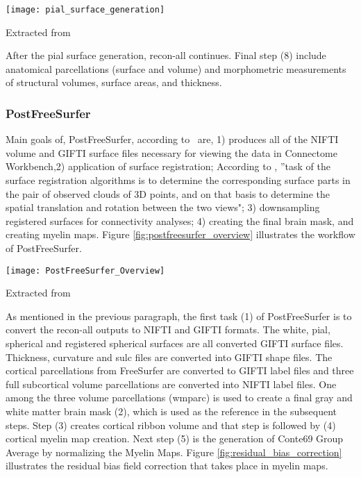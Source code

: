 \begin{center}
  \texttt{[image: pial\_surface\_generation]}
  \label{fig:pial_surface_generation}
  \caption*{Extracted from \cite{Gla13}}
\end{center}

After the pial surface generation, recon-all continues. Final step (8) include anatomical parcellations (surface and volume) and morphometric measurements of structural volumes, surface areas, and thickness.

\subsubsection{PostFreeSurfer}
Main goals of, PostFreeSurfer, according to~\cite{Gla13} are, 1) produces all of the NIFTI volume and GIFTI surface files necessary for viewing the data in Connectome Workbench,2) application of surface registration; According to \cite{DBLP:journals/corr/HrgeticP13}, ''task of the surface registration algorithms is to determine the corresponding surface parts in the pair of observed clouds of 3D points, and on that basis to determine the spatial translation and rotation between the two views"; 3) downsampling registered surfaces for connectivity analyses; 4) creating the final brain mask, and creating myelin maps. Figure \ref{fig:postfreesurfer_overview} illustrates the workflow of PostFreeSurfer.\\

\begin{center}
  \texttt{[image: PostFreeSurfer\_Overview]}
  \label{fig:postfreesurfer_overview}
  \caption*{Extracted from \cite{Gla13}}
\end{center}

As mentioned in the previous paragraph, the first task (1) of PostFreeSurfer is to convert the recon-all outputs to NIFTI and GIFTI formats. The white, pial, spherical and registered spherical surfaces are all converted GIFTI surface files. Thickness, curvature and sulc files are converted into GIFTI shape files. The cortical parcellations from FreeSurfer are converted to GIFTI label files and three full subcortical volume parcellations are converted into NIFTI label files. One among the three volume parcellations (wmparc) is used to create a final gray and white matter brain mask (2), which is used as the reference in the subsequent steps. Step (3) creates cortical ribbon volume and that step is followed by (4) cortical myelin map creation. Next step (5) is the generation of Conte69 Group Average by normalizing the Myelin Maps. Figure \ref{fig:residual_bias_correction} illustrates the residual bias field correction that takes place in myelin maps.

